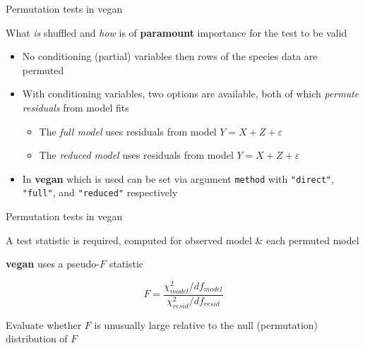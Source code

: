 \documentclass[10pt,ignorenonframetext,compress, aspectratio=169]{beamer}
\begin{document}
\begin{frame}{Permutation tests in vegan}

What \emph{is} shuffled and \emph{how} is of \textbf{paramount}
importance for the test to be valid

\begin{itemize}
\itemsep1pt\parskip0pt
\item
  No conditioning (partial) variables then rows of the species data are
  permuted
\item
  With conditioning variables, two options are available, both of which
  \emph{permute residuals} from model fits

  \begin{itemize}
  \itemsep1pt\parskip0pt
  \item
    The \emph{full model} uses residuals from model
    \(Y = X + Z + \varepsilon\)
  \item
    The \emph{reduced model} uses residuals from model
    \(Y = X + Z + \varepsilon\)
  \end{itemize}
\item
  In \textbf{vegan} which is used can be set via argument
  \texttt{method} with \texttt{"direct"}, \texttt{"full"}, and
  \texttt{"reduced"} respectively
\end{itemize}

\end{frame}

\begin{frame}{Permutation tests in vegan}

A test statistic is required, computed for observed model \& each
permuted model

\textbf{vegan} uses a pseudo-\(F\) statistic

\[F=\frac{\chi^2_{model} / df_{model}}{\chi^2_{resid} / df_{resid}}\]

Evaluate whether \(F\) is unusually large relative to the null
(permutation) distribution of \(F\)

\end{frame}
\end{document}

